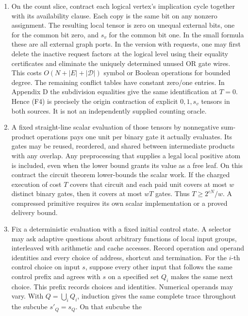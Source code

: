 \documentclass[
  11pt,
]{article}
\providecommand{\tightlist}{%
  \setlength{\itemsep}{0pt}\setlength{\parskip}{0pt}}
\begin{document}
\begin{enumerate}
\def\labelenumi{\arabic{enumi}.}
\tightlist
\item
  On the count slice, contract each logical vertex's implication cycle
  together with its availability clause. Each copy is the same bit on
  any nonzero assignment. The resulting local tensor is zero on unequal
  external bits, one for the common bit zero, and \(s_v\) for the common
  bit one. In the small formula these are all external graph ports. In
  the version with requests, one may first delete the inactive request
  factors at the logical level using their equality certificates and
  eliminate the uniquely determined unused OR gate wires. This costs
  \(O(N+|E|+|\mathcal D|)\) symbol or Boolean operations for bounded
  degree. The remaining conflict tables have constant zero/one entries.
  In Appendix D the subdivision equalities give the same identification
  at \(T=0\). Hence (F4) is precisely the origin contraction of explicit
  \(0,1,s_v\) tensors in both sources. It is not an independently
  supplied counting oracle.
\item
  A fixed straight-line scalar evaluation of those tensors by
  nonnegative sum-product operations pays one unit per binary gate it
  actually evaluates. Its gates may be reused, reordered, and shared
  between intermediate products with any overlap. Any preprocessing that
  supplies a legal local positive atom is included, even when the lower
  bound grants its value as a free leaf. On this contract the circuit
  theorem lower-bounds the scalar work. If the charged execution of cost
  \(T\) covers that circuit and each paid unit covers at most \(w\)
  distinct binary gates, then it covers at most \(wT\) gates. Thus
  \(T\ge2^{cN}/w\). A compressed primitive requires its own scalar
  implementation or a proved delivery bound.
\item
  Fix a deterministic evaluation with a fixed initial control state. A
  selector may ask adaptive questions about arbitrary functions of local
  input groups, interleaved with arithmetic and cache accesses. Record
  operation and operand identities and every choice of address, shortcut
  and termination. For the \(i\)-th control choice on input \(s\),
  suppose every other input that follows the same control prefix and
  agrees with \(s\) on a specified set \(Q_i\) makes the same next
  choice. This prefix records choices and identities. Numerical operands
  may vary. With \(Q=\bigcup_i Q_i\), induction gives the same complete
  trace throughout the subcube \(s'_Q=s_Q\). On that subcube the

\end{enumerate}
\end{document}
